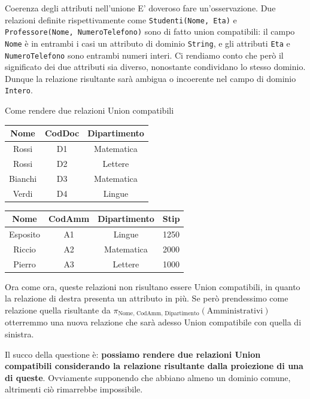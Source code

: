 \documentclass[12pt]{report}
\begin{document}
	\begin{osservazione}{Coerenza degli attributi nell'unione}{}
		E' doveroso fare un'osservazione. Due relazioni definite rispettivamente come \texttt{Studenti(Nome, Eta)} e \texttt{Professore(Nome, NumeroTelefono)} sono di fatto union compatibili: il campo \texttt{Nome} è in entrambi i casi un attributo di dominio \texttt{String}, e gli attributi \texttt{Eta} e \texttt{NumeroTelefono} sono entrambi numeri interi. Ci rendiamo conto che però il significato dei due attributi sia diverso, nonostante condividano lo stesso dominio. Dunque la relazione risultante sarà ambigua o incoerente nel campo di dominio \texttt{Intero}.
	\end{osservazione}
	
	\begin{osservazione}{Come rendere due relazioni Union compatibili}{}
		
		\begin{minipage}[t]{0.45\textwidth}
			\centering
			\renewcommand{\arraystretch}{1.3}
			\begin{tabular}{|c|c|c|}
				\hline
				\rowcolor{BrickRed!60!white}
				Nome & CodDoc & Dipartimento \\
				\hline
				Rossi   & D1 & Matematica \\
				Rossi   & D2 & Lettere    \\
				Bianchi & D3 & Matematica \\
				Verdi   & D4 & Lingue     \\
				\hline
			\end{tabular}
		\end{minipage}\hfill
		\begin{minipage}[t]{0.53\textwidth}
			\centering
			\renewcommand{\arraystretch}{1.3}
			\begin{tabular}{|c|c|c|c|}
				\hline
				\rowcolor{BrickRed!60!white}
				Nome & CodAmm & Dipartimento & Stip \\
				\hline
				Esposito & A1 & Lingue     & 1250 \\
				Riccio   & A2 & Matematica & 2000 \\
				Pierro   & A3 & Lettere    & 1000 \\
				\hline
			\end{tabular}
		\end{minipage}
		
		\vspace{1em}
		Ora come ora, queste relazioni non risultano essere Union compatibili, in quanto la relazione di destra presenta un attributo in più. Se però prendessimo come relazione quella risultante da $\pi_{\text{Nome, CodAmm, Dipartimento}}(\text{Amministrativi})$ otterremmo una nuova relazione che sarà adesso Union compatibile con quella di sinistra.
		\smallbreak
		
		Il succo della questione è: \textbf{possiamo rendere due relazioni Union compatibili considerando la relazione risultante dalla proiezione di una di queste}. Ovviamente supponendo che abbiano almeno un dominio comune, altrimenti ciò rimarrebbe impossibile.
	\end{osservazione}
	
\end{document}
